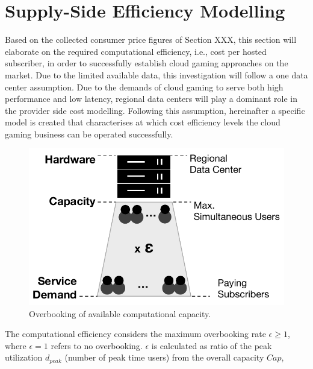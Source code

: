 
\section{Supply-Side Efficiency Modelling} %



Based on the collected consumer price figures of Section XXX, this section will elaborate on the required computational efficiency, i.e., cost per hosted subscriber, in order to successfully establish cloud gaming approaches on the market. Due to the limited available data, this investigation will follow a one data center assumption. Due to the demands of cloud gaming to serve both high performance and low latency, regional data centers will play a dominant role in the provider side cost modelling. Following this assumption, hereinafter a specific model is created that characterises at which cost efficiency levels the cloud gaming business can be operated successfully.

\begin{figure}[!t]
	\centering
	\includegraphics[width=0.65\columnwidth]{images/overbooking_datacenter.pdf}
	\caption{Overbooking of available computational capacity.}
\label{fig:overbooking_datacenter}
\end{figure}

The computational efficiency considers the maximum overbooking rate $\epsilon \geq 1$, where $\epsilon = 1$ refers to no overbooking. $\epsilon$ is calculated as ratio of the peak utilization $d_{peak}$ (number of peak time users) from the overall capacity $Cap$, 

